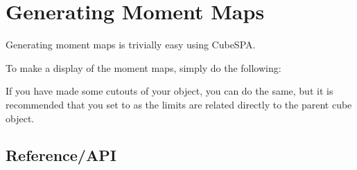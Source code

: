 \documentclass[letterpaper,10pt,english]{sphinxmanual}
\let\sphinxpxdimen\pdfpxdimen\else\newdimen\sphinxpxdimen
\begin{document}
\section{Generating Moment Maps}
\label{\detokenize{momentmaps:generating-moment-maps}}\label{\detokenize{momentmaps::doc}}
\sphinxAtStartPar
Generating moment maps is trivially easy using CubeSPA.

\sphinxAtStartPar
To make a display of the moment maps, simply do the following:

\begin{sphinxVerbatim}[commandchars=\\\{\}]
 
   
\end{sphinxVerbatim}

\sphinxAtStartPar
If you have made some cutouts of your object, you can do the same, but it is recommended that you
set  to  as the limits are related directly to the parent cube object.

\begin{sphinxVerbatim}[commandchars=\\\{\}]
\end{sphinxVerbatim}

\noindent\sphinxincludegraphics[width=800\sphinxpxdimen]{{blob}.png}


\subsection{Reference/API}
\label{\detokenize{momentmaps:module-cubespa.plotting.mommap_plots}}\label{\detokenize{momentmaps:reference-api}}
\end{document}
